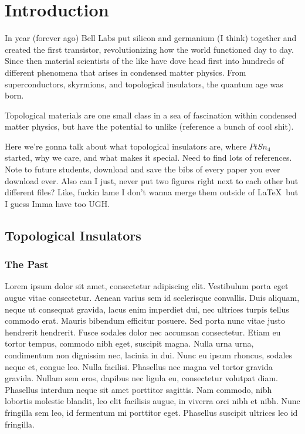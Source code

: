 
\chapter{Introduction}
\label{ch:Introduction}


In year (forever ago) Bell Labs put silicon and germanium (I think) together and created the first transistor, revolutionizing how the world functioned day to day. Since then material scientists of the like have dove head first into hundreds of different phenomena that arises in condensed matter physics. From superconductors, skyrmions, and topological insulators, the quantum age was born.

Topological materials are one small class in a sea of fascination within condensed matter physics, but have the potential to unlike (reference a bunch of cool shit).

Here we're gonna talk about what topological insulators are, where $PtSn_4$ started, why we care, and what makes it special. Need to find lots of references. Note to future students, download and save the bibs of every paper you ever download ever. Also can I just, never put two figures right next to each other but different files? Like, fuckin lame I don't wanna merge them outside of \LaTeX\ but I guess Imma have too UGH.

\section{Topological Insulators}

\subsection{The Past}
Lorem ipsum dolor sit amet, consectetur adipiscing elit. Vestibulum porta eget augue vitae consectetur. Aenean varius sem id scelerisque convallis. Duis aliquam, neque ut consequat gravida, lacus enim imperdiet dui, nec ultrices turpis tellus commodo erat. Mauris bibendum efficitur posuere. Sed porta nunc vitae justo hendrerit hendrerit. Fusce sodales dolor nec accumsan consectetur. Etiam eu tortor tempus, commodo nibh eget, suscipit magna. Nulla urna urna, condimentum non dignissim nec, lacinia in dui. Nunc eu ipsum rhoncus, sodales neque et, congue leo. Nulla facilisi. Phasellus nec magna vel tortor gravida gravida. Nullam sem eros, dapibus nec ligula eu, consectetur volutpat diam. Phasellus interdum neque sit amet porttitor sagittis. Nam commodo, nibh lobortis molestie blandit, leo elit facilisis augue, in viverra orci nibh et nibh. Nunc fringilla sem leo, id fermentum mi porttitor eget. Phasellus suscipit ultrices leo id fringilla.

